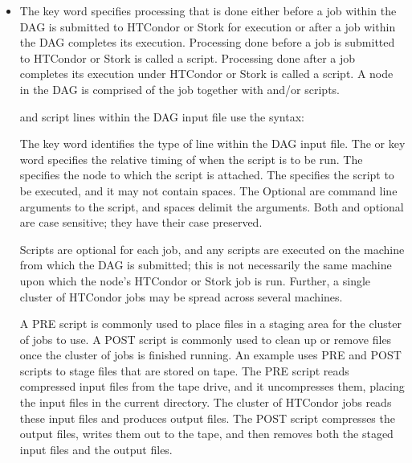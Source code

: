 \begin{itemize}
\label{dagman:SCRIPT}
\item {}

The  key word specifies
processing that is done either before a job within
the DAG is submitted to HTCondor or Stork for execution
or after
a job within
the DAG completes its execution.
Processing done before a job is submitted to HTCondor or Stork is
called a  script.
Processing done after a job completes
its execution under HTCondor or Stork is
called a  script.
A node in the DAG is comprised of the job together with
 and/or  scripts.

 and  script lines within the DAG input file
use the syntax:

    

     

The  key word identifies the type of line within
the DAG input file.
The  or  key word
specifies the relative timing of when the script is to be run.
The  specifies the node to which the script is attached.
The 
specifies the script to be executed, 
and it may not contain spaces.
The Optional  are command line arguments to the script,
and spaces delimit the arguments.
Both  and optional  are
case sensitive; they have their case preserved.

Scripts are optional for each job, and
any scripts are executed on the machine
from which the DAG is submitted; this is not necessarily
the same machine upon which the node's HTCondor or Stork job is run.
Further, a single cluster of HTCondor jobs may be
spread across several machines.

A PRE script is commonly used
to place files in a staging area for the cluster of jobs to use.
A POST script is commonly used
to clean up or remove files once the cluster of jobs is finished running.
An example uses PRE and POST scripts to stage files
that are stored on tape.
The PRE script reads compressed input files from the tape drive,
and it uncompresses them, placing the input files in the current directory.
The cluster of HTCondor jobs reads these input files
and produces output files.
The POST script compresses the output files, writes them out to
the tape, and then removes both the staged input files and the output files.


\end{itemize}
